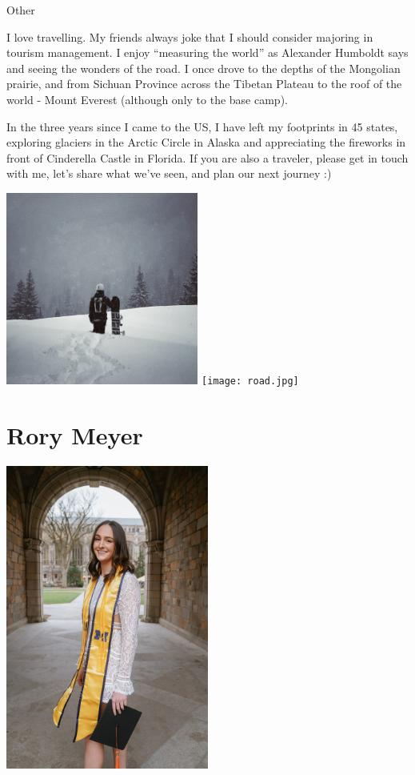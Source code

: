 \documentclass[
]{book}
\begin{document}
Other

I love travelling. My friends always joke that I should consider majoring in tourism management. I enjoy ``measuring the world'' as Alexander Humboldt says and seeing the wonders of the road. I once drove to the depths of the Mongolian prairie, and from Sichuan Province across the Tibetan Plateau to the roof of the world - Mount Everest (although only to the base camp).

In the three years since I came to the US, I have left my footprints in 45 states, exploring glaciers in the Arctic Circle in Alaska and appreciating the fireworks in front of Cinderella Castle in Florida. If you are also a traveler, please get in touch with me, let's share what we've seen, and plan our next journey :)

\includegraphics[width=0.475\textwidth,height=\textheight]{sb1.jpeg} \texttt{[image: road.jpg]}

\hypertarget{rory-meyer}{%
\section{Rory Meyer}\label{rory-meyer}}

\includegraphics[width=0.5\textwidth,height=\textheight]{gradphoto.jpg}
\end{document}
